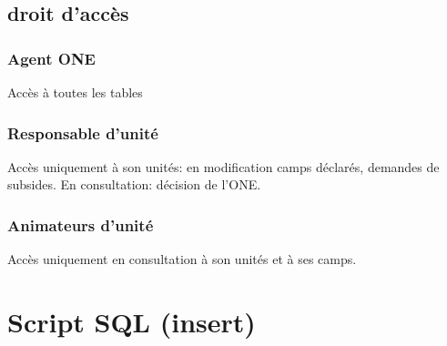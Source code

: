 \subsection{droit d'accès}
\subsubsection{Agent ONE}
Accès à toutes les tables


\subsubsection{Responsable d'unité}
Accès uniquement à son unités: en modification camps déclarés, demandes de subsides. En consultation: décision de l'ONE. 



\subsubsection{Animateurs d'unité}
Accès uniquement en consultation à son unités et à ses camps. 










\section{Script SQL (insert)}